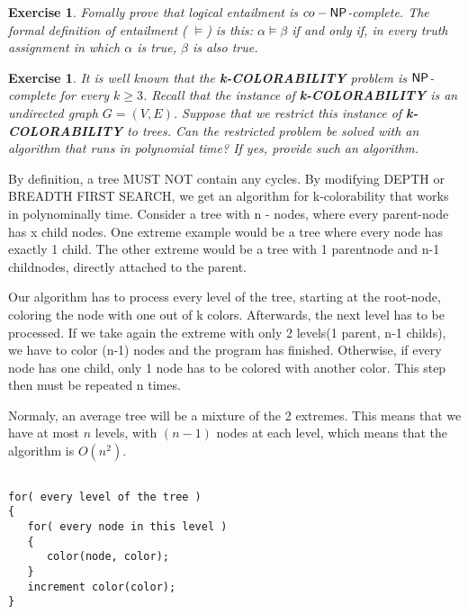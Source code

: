 \documentclass [11pt]{article}
\newenvironment{mylisting}
{\begin{list}{}{\setlength{\leftmargin}{1em}}\item\scriptsize\bfseries}
{\end{list}}
\newtheorem{exercise}[theorem]{Exercise}
\newcommand{\ccfont}[1]{\protect\mathsf{#1}}
\newcommand{\NP}{\ccfont{NP}}
\newcommand{\solution}[1]{\noindent {\bf Solution.}  #1}
\begin{document}
\begin{exercise}
  \label{ex:CO-NP}
  Fomally prove that logical entailment is $co-\NP$-complete. The formal definition of entailment ( $\models$) is this: $\alpha \models \beta$ if and only if, in every truth assignment in which $\alpha$ is true, $\beta$ is also true.  
\end{exercise}





\begin{exercise}
  \label{ex:Colors}
  It is well known that the \textbf{k-COLORABILITY} problem is $\NP$-complete for every $k \geq 3$. Recall that the instance of \textbf{k-COLORABILITY} is an undirected graph $G = (V, E)$. Suppose that we restrict this instance of \textbf{k-COLORABILITY} to trees. Can the restricted problem be solved with an algorithm that runs in polynomial time? If yes, provide such an algorithm. 
\end{exercise}


\solution

By definition, a tree MUST NOT contain any cycles. By modifying DEPTH or BREADTH FIRST SEARCH, we get an algorithm for k-colorability that works in polynominally time. Consider a tree with n - nodes, where every parent-node has x child nodes. One extreme example would be a tree where every node has exactly 1 child. The other extreme would be a tree with 1 parentnode and n-1 childnodes, directly attached to the parent.

Our algorithm has to process every level of the tree, starting at the root-node, coloring the node with one out of k colors. Afterwards, the next level has to be processed. If we take again the extreme with only 2 levels(1 parent, n-1 childs), we have to color (n-1) nodes and the program has finished. Otherwise, if every node has one child, only 1 node has to be colored with another color. This step then must be repeated n times.

Normaly, an average tree will be a mixture of the 2 extremes. This means that we have at most $n$ levels, with $(n-1)$ nodes at each level, which means that the algorithm is $O(n^2)$.  

\begin{mylisting}
\begin{verbatim}

for( every level of the tree )
{
   for( every node in this level )
   {
      color(node, color);
   }
   increment color(color);
}

\end{verbatim}
\end{mylisting}
\end{document}
